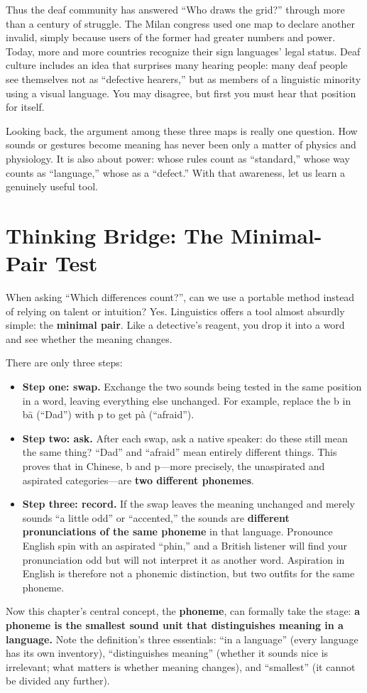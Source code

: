 Thus the deaf community has answered ``Who draws the grid?'' through more than a century of struggle. The Milan congress used one map to declare another invalid, simply because users of the former had greater numbers and power. Today, more and more countries recognize their sign languages' legal status. Deaf culture includes an idea that surprises many hearing people: many deaf people see themselves not as ``defective hearers,'' but as members of a linguistic minority using a visual language. You may disagree, but first you must hear that position for itself.

Looking back, the argument among these three maps is really one question. How sounds or gestures become meaning has never been only a matter of physics and physiology. It is also about power: whose rules count as ``standard,'' whose way counts as ``language,'' whose as a ``defect.'' With that awareness, let us learn a genuinely useful tool.

\section{Thinking Bridge: The Minimal-Pair Test}
When asking ``Which differences count?'', can we use a portable method instead of relying on talent or intuition? Yes. Linguistics offers a tool almost absurdly simple: the \textbf{minimal pair}. Like a detective's reagent, you drop it into a word and see whether the meaning changes.

There are only three steps:

\begin{itemize}
\item \textbf{Step one: swap.} Exchange the two sounds being tested in the same position in a word, leaving everything else unchanged. For example, replace the b in bā (``Dad'') with p to get pà (``afraid'').
\item \textbf{Step two: ask.} After each swap, ask a native speaker: do these still mean the same thing? ``Dad'' and ``afraid'' mean entirely different things. This proves that in Chinese, b and p---more precisely, the unaspirated and aspirated categories---are \textbf{two different phonemes}.
\item \textbf{Step three: record.} If the swap leaves the meaning unchanged and merely sounds ``a little odd'' or ``accented,'' the sounds are \textbf{different pronunciations of the same phoneme} in that language. Pronounce English spin with an aspirated ``phin,'' and a British listener will find your pronunciation odd but will not interpret it as another word. Aspiration in English is therefore not a phonemic distinction, but two outfits for the same phoneme.
\end{itemize}
Now this chapter's central concept, the \textbf{phoneme}, can formally take the stage: \textbf{a phoneme is the smallest sound unit that distinguishes meaning in a language.} Note the definition's three essentials: ``in a language'' (every language has its own inventory), ``distinguishes meaning'' (whether it sounds nice is irrelevant; what matters is whether meaning changes), and ``smallest'' (it cannot be divided any further).

